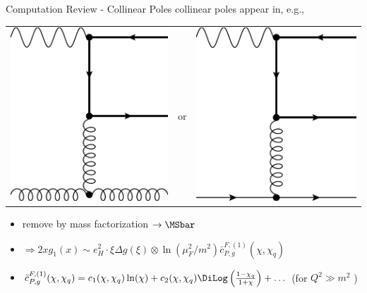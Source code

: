 \begin{frame}{Computation Review - Collinear Poles}
collinear poles appear in, e.g.,
\begin{center}
\begin{tabular}{wnw}
\includegraphics[width=.2\textwidth]{img/nlo-g-4}
&or
&\includegraphics[width=.2\textwidth]{img/nlo-q-1}
\end{tabular}
\end{center}

\begin{itemize}
\item remove by mass factorization $\to \MSbar$
\item $\Rightarrow 2xg_1(x) \sim e_H^2\cdot \xi\Delta g(\xi) \otimes \ln(\mu_F^2/m^2) \bar c_{P,g}^{F,(1)}(\chi,\chi_q)$
\item $\bar c_{P,g}^{F,(1)}(\chi,\chi_q) = c_1(\chi,\chi_q)\ln(\chi) + c_2(\chi,\chi_q)\DiLog\left(\frac{1-\chi_q}{1+\chi}\right) + \ldots$ (\checkmark for $Q^2\gg m^2$ )
\end{itemize}
\end{frame}


